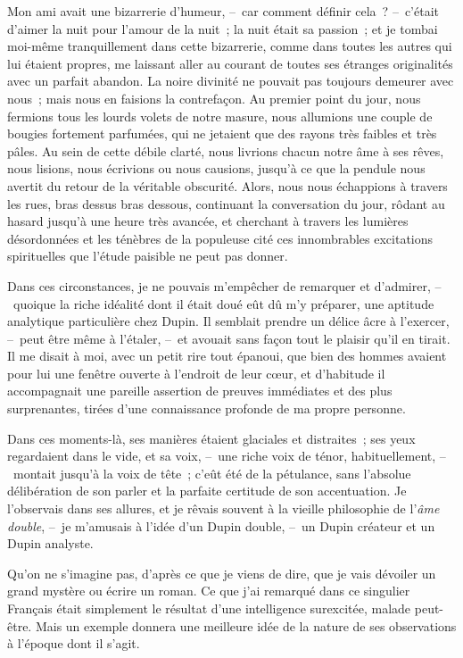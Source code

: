 \documentclass[french,twoside]{book} %
\begin{document}
Mon ami avait une bizarrerie d’humeur, – car comment définir cela ? – c’était d’aimer la nuit pour l’amour de la nuit ; la nuit était sa passion ; et je tombai moi-même tranquillement dans cette bizarrerie, comme dans toutes les autres qui lui étaient propres, me laissant aller au courant de toutes ses étranges originalités avec un parfait abandon. La noire divinité ne pouvait pas toujours demeurer avec nous ; mais nous en faisions la contrefaçon. Au premier point du jour, nous fermions tous les lourds volets de notre masure, nous allumions une couple de bougies fortement parfumées, qui ne jetaient que des rayons très faibles et très pâles. Au sein de cette débile clarté, nous livrions chacun notre âme à ses rêves, nous lisions, nous écrivions ou nous causions, jusqu’à ce que la pendule nous avertit du retour de la véritable obscurité. Alors, nous nous échappions à travers les rues, bras dessus bras dessous, continuant la conversation du jour, rôdant au hasard jusqu’à une heure très avancée, et cherchant à travers les lumières désordonnées et les ténèbres de la populeuse cité ces innombrables excitations spirituelles que l’étude paisible ne peut pas donner.\par
Dans ces circonstances, je ne pouvais m’empêcher de remarquer et d’admirer, – quoique la riche idéalité dont il était doué eût dû m’y préparer, une aptitude analytique particulière chez Dupin. Il semblait prendre un délice âcre à l’exercer, – peut être même à l’étaler, – et avouait sans façon tout le plaisir qu’il en tirait. Il me disait à moi, avec un petit rire tout épanoui, que bien des hommes avaient pour lui une fenêtre ouverte à l’endroit de leur cœur, et d’habitude il accompagnait une pareille assertion de preuves immédiates et des plus surprenantes, tirées d’une connaissance profonde de ma propre personne.\par
Dans ces moments-là, ses manières étaient glaciales et distraites ; ses yeux regardaient dans le vide, et sa voix, – une riche voix de ténor, habituellement, – montait jusqu’à la voix de tête ; c’eût été de la pétulance, sans l’absolue délibération de son parler et la parfaite certitude de son accentuation. Je l’observais dans ses allures, et je rêvais souvent à la vieille philosophie de l’\emph{âme double}, – je m’amusais à l’idée d’un Dupin double, – un Dupin créateur et un Dupin analyste.\par
Qu’on ne s’imagine pas, d’après ce que je viens de dire, que je vais dévoiler un grand mystère ou écrire un roman. Ce que j’ai remarqué dans ce singulier Français était simplement le résultat d’une intelligence surexcitée, malade peut-être. Mais un exemple donnera une meilleure idée de la nature de ses observations à l’époque dont il s’agit.\par
\end{document}

